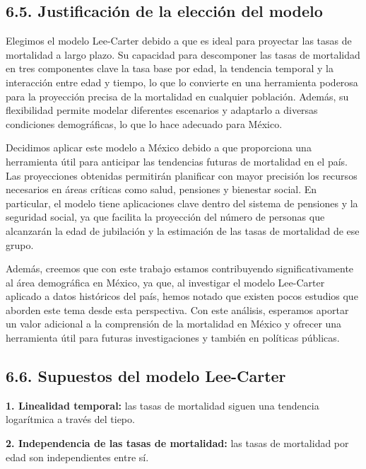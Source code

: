 \documentclass[
]{article}
\begin{document}
\hypertarget{justificaciuxf3n-de-la-elecciuxf3n-del-modelo}{%
\subsection{6.5. Justificación de la elección del
modelo}\label{justificaciuxf3n-de-la-elecciuxf3n-del-modelo}}

Elegimos el modelo Lee-Carter debido a que es ideal para proyectar las
tasas de mortalidad a largo plazo. Su capacidad para descomponer las
tasas de mortalidad en tres componentes clave la tasa base por edad, la
tendencia temporal y la interacción entre edad y tiempo, lo que lo
convierte en una herramienta poderosa para la proyección precisa de la
mortalidad en cualquier población. Además, su flexibilidad permite
modelar diferentes escenarios y adaptarlo a diversas condiciones
demográficas, lo que lo hace adecuado para México.

Decidimos aplicar este modelo a México debido a que proporciona una
herramienta útil para anticipar las tendencias futuras de mortalidad en
el país. Las proyecciones obtenidas permitirán planificar con mayor
precisión los recursos necesarios en áreas críticas como salud,
pensiones y bienestar social. En particular, el modelo tiene
aplicaciones clave dentro del sistema de pensiones y la seguridad
social, ya que facilita la proyección del número de personas que
alcanzarán la edad de jubilación y la estimación de las tasas de
mortalidad de ese grupo.

Además, creemos que con este trabajo estamos contribuyendo
significativamente al área demográfica en México, ya que, al investigar
el modelo Lee-Carter aplicado a datos históricos del país, hemos notado
que existen pocos estudios que aborden este tema desde esta perspectiva.
Con este análisis, esperamos aportar un valor adicional a la comprensión
de la mortalidad en México y ofrecer una herramienta útil para futuras
investigaciones y también en políticas públicas.

\hypertarget{supuestos-del-modelo-lee-carter}{%
\subsection{6.6. Supuestos del modelo
Lee-Carter}\label{supuestos-del-modelo-lee-carter}}

\textbf{1. Linealidad temporal:} las tasas de mortalidad siguen una
tendencia logarítmica a través del tiepo.

\textbf{2. Independencia de las tasas de mortalidad:} las tasas de
mortalidad por edad son independientes entre sí.
\end{document}
